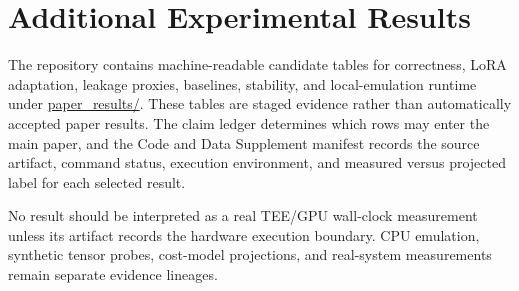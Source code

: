 \section{Additional Experimental Results}
\label{supp:additional-results}

The repository contains machine-readable candidate tables for correctness,
LoRA adaptation, leakage proxies, baselines, stability, and local-emulation
runtime under \url{paper_results/}. These tables are staged evidence rather than
automatically accepted paper results. The claim ledger determines which rows
may enter the main paper, and the Code and Data Supplement manifest records the
source artifact, command status, execution environment, and measured versus
projected label for each selected result.

No result should be interpreted as a real TEE/GPU wall-clock measurement unless
its artifact records the hardware execution boundary. CPU emulation, synthetic
tensor probes, cost-model projections, and real-system measurements remain
separate evidence lineages.
